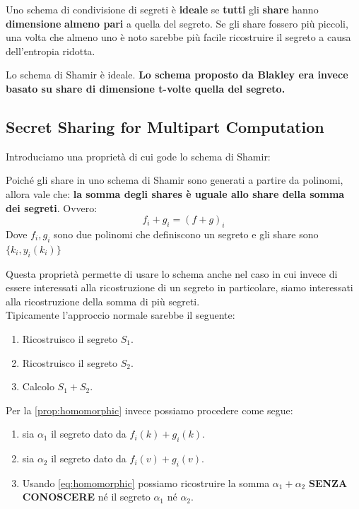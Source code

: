 \begin{corollary}
Uno schema di condivisione di segreti è \textbf{ideale} se \textbf{tutti} gli \textbf{share} hanno \textbf{dimensione} \textbf{almeno pari} a quella del segreto. Se gli share fossero più piccoli, una volta che almeno uno è noto sarebbe più facile ricostruire il segreto a causa dell'entropia ridotta.
\end{corollary}
\begin{note}
Lo schema di Shamir è ideale.\textbf{ Lo schema proposto da Blakley era invece basato su share di dimensione t-volte quella del segreto.}
\end{note}
\subsection{Secret Sharing for Multipart Computation}
Introduciamo una proprietà di cui gode lo schema di Shamir:
\begin{proposition}\label{prop:homomorphic}
Poiché gli share in uno schema di Shamir sono generati a partire da polinomi, allora vale che: \textbf{la somma degli shares è uguale allo share della somma dei segreti}. Ovvero:
\begin{equation}\label{eq:homomorphic}
    f_i+g_i = (f+g)_i
\end{equation}
Dove $f_i,g_i$ sono due polinomi che definiscono un segreto e gli share sono $\{k_i,y_i(k_i)\}$
\end{proposition}
Questa proprietà permette di usare lo schema anche nel caso in cui invece di essere interessati alla ricostruzione di un segreto in particolare, siamo interessati alla ricostruzione della somma di più segreti.\\
Tipicamente l'approccio normale sarebbe il seguente:
\begin{enumerate}
    \item Ricostruisco il segreto $S_1$.
    \item Ricostruisco il segreto $S_2$.
    \item Calcolo $S_1+S_2$.
\end{enumerate}
Per la \cref{prop:homomorphic} invece possiamo procedere come segue:
\begin{enumerate}
    \item sia $\alpha_1$ il segreto dato da $f_i(k)+g_i(k)$.
    \item sia $\alpha_2$ il segreto dato da $f_i(v)+g_i(v)$.
    \item Usando \cref{eq:homomorphic} possiamo ricostruire la somma $\alpha_1+\alpha_2$ \textbf{SENZA CONOSCERE} né il segreto $\alpha_1$ né $\alpha_2$.
\end{enumerate}
